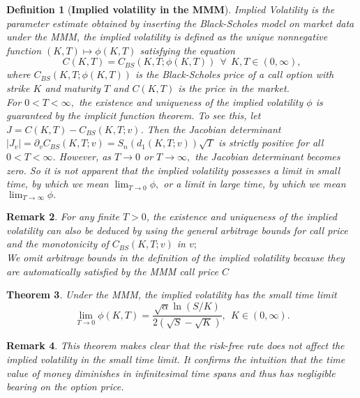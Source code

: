 \documentclass[a4 paper, 12pt]{report}
\theoremstyle{plain}
\newtheorem{theorem}{\textbf{Theorem}}[section]
\newtheorem{definition}[theorem]{\textbf{Definition}}
\newtheorem{remark}[theorem]{\textbf{Remark}}
\begin{document}
\begin{definition}[\textbf{Implied volatility in the MMM}]\label{4.1}
\normalfont
Implied Volatility is the parameter estimate obtained by inserting the Black-Scholes model on market data under the MMM, the implied volatility is defined as the unique nonnegative function $(K,T)\mapsto\phi(K,T)$ satisfying the equation
\begin{equation}\label{4.10}
C(K,T) = C_{BS}(K,T;\phi(K,T))~~\forall~~K,T\in(0,\infty),
\end{equation}
where $C_{BS}(K,T;\phi(K,T))$ is the Black-Scholes price of a call option with strike $K$ and maturity $T$ and $C(K,T)$ is the price in the market.\\
For $0 < T < \infty,$ the existence and uniqueness of the implied volatility $\phi$ is guaranteed
by the implicit function theorem. To see this, let $J = C(K, T) - C_{BS}(K, T; v)$. Then the
Jacobian determinant $|J_v| = \partial_vC_{BS}(K, T; v) = S_n(d_1(K,T;v))\sqrt{T}$ is strictly positive for all $0 < T < \infty$. However, as $T \rightarrow 0$ or $T \rightarrow \infty,$ the Jacobian determinant becomes zero. So it is not apparent that the implied volatility possesses a limit in small time, by which we mean $\lim_{T\rightarrow0}\phi,$ or a limit in large time, by which we mean $\lim_{T\rightarrow\infty}\phi.$
\end{definition}
\begin{remark}\label{R1}
\normalfont
For any finite $T > 0$, the existence and uniqueness of the implied volatility can
also be deduced by using the general arbitrage bounds for call price and the monotonicity
of $C_{BS}(K, T; v)$ in $v;$\\%
 We omit arbitrage bounds in the definition of the
implied volatility because they are automatically satisfied by the MMM call price $C$%
\end{remark}

\begin{theorem}\cite[pg.~9]{guo2011small}\label{T4.1}
Under the MMM, the implied volatility has the small time limit
\begin{equation}\label{4.11}
\lim_{T\rightarrow 0}\phi(K,T) = \frac{\sqrt{\alpha}\ln(S/K)}{2(\sqrt{S} - \sqrt{K})},~~K\in(0,\infty).
\end{equation}
\end{theorem}
\begin{remark}
\normalfont
This theorem makes clear that the risk-free rate does not affect the implied volatility in
the small time limit. It confirms the intuition that the time value of money diminishes in
infinitesimal time spans and thus has negligible bearing on the option price.
\end{remark}
\end{document}
